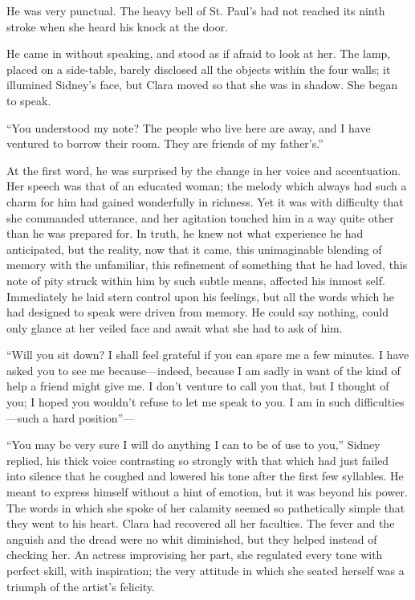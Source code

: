 He was very punctual. The heavy bell of St. Paul's had not reached its
ninth stroke when she heard his knock at the door.

He came in without speaking, and stood as if afraid to look at her. The
lamp, placed on a side-table, barely disclosed all the objects within
the four walls; it illumined Sidney's face, but Clara moved so that she
was in shadow. She began to speak.

``You understood my note? The people who live here are away, and I have
ventured to borrow their room. They are friends of my father's.''

At the first word, he was surprised by the change in her voice and
accentuation. Her speech was that of an educated woman; the melody which
always had such a charm for him had gained wonderfully in richness. Yet
it was with difficulty that she commanded utterance, and her agitation
touched him in a way quite other than he was prepared for. In
{\protect\hypertarget{79}{}{}} truth, he knew not what experience he had
anticipated, but the reality, now that it came, this unimaginable
blending of memory with the unfamiliar, this refinement of something
that he had loved, this note of pity struck within him by such subtle
means, affected his inmost self. Immediately he laid stern control upon
his feelings, but all the words which he had designed to speak were
driven from memory. He could say nothing, could only glance at her
veiled face and await what she had to ask of him.

``Will you sit down? I shall feel grateful if you can spare me a few
minutes. I have asked you to see me because---indeed, because I am sadly
in want of the kind of help a friend might give me. I don't venture to
call you that, but I thought of you; I hoped you wouldn't refuse to let
me speak to you. I am in such difficulties---such a hard position''---

``You may be very sure I will do anything I can to be of use to you,''
Sidney replied, his thick voice contrasting so strongly with that which
had just failed into silence that he coughed and lowered his tone after
the first few syllables. He meant to express himself
{\protect\hypertarget{80}{}{}} without a hint of emotion, but it was
beyond his power. The words in which she spoke of her calamity seemed so
pathetically simple that they went to his heart. Clara had recovered all
her faculties. The fever and the anguish and the dread were no whit
diminished, but they helped instead of checking her. An actress
improvising her part, she regulated every tone with perfect skill, with
inspiration; the very attitude in which she seated herself was a triumph
of the artist's felicity.

